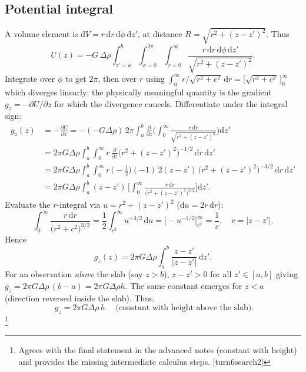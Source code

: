 \documentclass[11pt,a4paper]{article}
\begin{document}
\subsection{Potential integral}
A volume element is $\mathrm{d}V = r\,\mathrm{d}r\,\mathrm{d}\phi\,\mathrm{d}z'$, at distance $R=\sqrt{r^2+(z-z')^2}$. Thus
\begin{equation}
  U(z) = -G\,\Delta\rho \int_{z'=a}^{b} \int_{\phi=0}^{2\pi} \int_{r=0}^{\infty} \frac{r\,\mathrm{d}r\,\mathrm{d}\phi\,\mathrm{d}z'}{\sqrt{r^2+(z-z')^2}}.
\end{equation}
Integrate over $\phi$ to get $2\pi$, then over $r$ using $\int_0^{\infty} r/\sqrt{r^2+c^2}\,\mathrm{d}r = \big[\sqrt{r^2+c^2}\,\big]_0^{\infty}$ which diverges linearly; the physically meaningful quantity is the gradient $g_z=-\partial U/\partial z$ for which the divergence cancels. Differentiate under the integral sign:
\begin{align}
  g_z(z) &= -\frac{\partial U}{\partial z} = -(-G\Delta\rho)\,2\pi\int_a^{b} \frac{\partial}{\partial z}\Big( \int_0^{\infty} \frac{r\,\mathrm{d}r}{\sqrt{r^2+(z-z')^2}} \Big)\mathrm{d}z' \\
   &= 2\pi G\Delta\rho\int_a^{b} \int_0^{\infty} r\,\frac{\partial}{\partial z}\Big( r^2+(z-z')^2 \Big)^{-1/2}\,\mathrm{d}r\,\mathrm{d}z' \\
   &= 2\pi G\Delta\rho\int_a^{b} \int_0^{\infty} r\,\Big( -\tfrac12\Big)(-1)\,2(z-z')\,\big(r^2+(z-z')^2\big)^{-3/2}\,\mathrm{d}r\,\mathrm{d}z' \\
   &= 2\pi G\Delta\rho\int_a^{b} (z-z')\,\Big[\int_0^{\infty} \frac{ r\,\mathrm{d}r}{\big(r^2+(z-z')^2\big)^{3/2}}\Big] \mathrm{d}z'.
\end{align}
Evaluate the $r$-integral via $u=r^2+(z-z')^2$ ($\mathrm{d}u=2r\,\mathrm{d}r$):
\begin{equation}
  \int_0^{\infty} \frac{ r\,\mathrm{d}r}{\big(r^2+c^2\big)^{3/2}} = \frac12\int_{c^2}^{\infty} u^{-3/2}\,\mathrm{d}u = \Big[ -u^{-1/2} \Big]_{c^2}^{\infty} = \frac{1}{c},\quad c=|z-z'|.
\end{equation}
Hence
\begin{equation}
  g_z(z) = 2\pi G\Delta\rho \int_a^{b} \frac{z-z'}{|z-z'|}\,\mathrm{d}z'.
\end{equation}
For an observation \emph{above} the slab (say $z> b$), $z-z'>0$ for all $z'\in[a,b]$ giving $g_z=2\pi G\Delta\rho\,(b-a)=2\pi G\Delta\rho h$. The same constant emerges for $z<a$ (direction reversed inside the slab). Thus,
\begin{equation}
  \boxed{\;g_z = 2\pi G\Delta\rho\,h\;} \quad \text{(constant with height above the slab).}
\end{equation}
\footnote{Agrees with the final statement in the advanced notes (constant with height) and provides the missing intermediate calculus steps. [turn6search2]}
\end{document}
